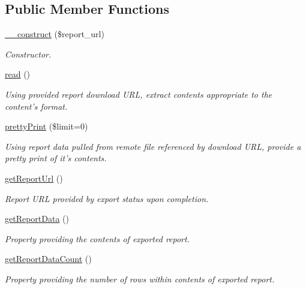 \subsection*{Public Member Functions}
\begin{DoxyCompactItemize}
\item 
\hyperlink{classTune_1_1Management_1_1Reports_1_1ReportReaderBase_a41acf646156b9c6e339f36e13b2b0609}{\-\_\-\-\_\-construct} (\$report\-\_\-url)
\begin{DoxyCompactList}\small\item\em Constructor. \end{DoxyCompactList}\item 
\hyperlink{classTune_1_1Management_1_1Reports_1_1ReportReaderBase_ac6379909340b368795203684ff2cf052}{read} ()
\begin{DoxyCompactList}\small\item\em Using provided report download U\-R\-L, extract contents appropriate to the content's format. \end{DoxyCompactList}\item 
\hyperlink{classTune_1_1Management_1_1Reports_1_1ReportReaderBase_a3f7907396b1f57fe3ca34c41f752a48d}{pretty\-Print} (\$limit=0)
\begin{DoxyCompactList}\small\item\em Using report data pulled from remote file referenced by download U\-R\-L, provide a pretty print of it's contents. \end{DoxyCompactList}\item 
\hyperlink{classTune_1_1Management_1_1Reports_1_1ReportReaderBase_a4a9816979759681b20f8d48a15064847}{get\-Report\-Url} ()
\begin{DoxyCompactList}\small\item\em Report U\-R\-L provided by export status upon completion. \end{DoxyCompactList}\item 
\hyperlink{classTune_1_1Management_1_1Reports_1_1ReportReaderBase_ad725298fd1ca2bd93b4edb16f9eeb7a0}{get\-Report\-Data} ()
\begin{DoxyCompactList}\small\item\em Property providing the contents of exported report. \end{DoxyCompactList}\item 
\hyperlink{classTune_1_1Management_1_1Reports_1_1ReportReaderBase_a2c72cc09cd312685d20b4aed2efd1291}{get\-Report\-Data\-Count} ()
\begin{DoxyCompactList}\small\item\em Property providing the number of rows within contents of exported report. \end{DoxyCompactList}\item 

\end{DoxyCompactItemize}
